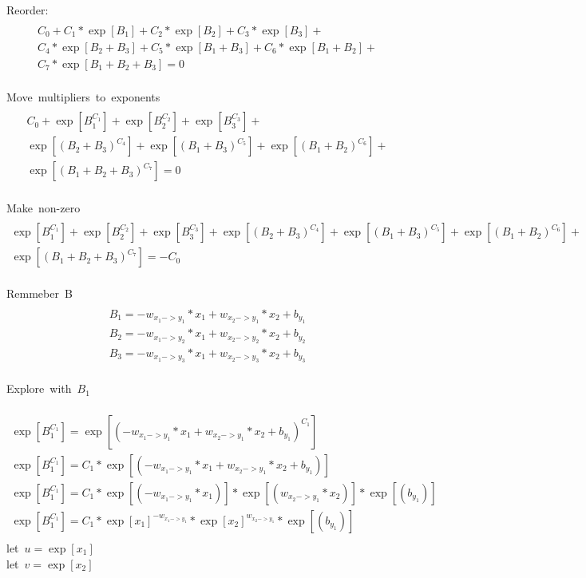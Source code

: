 \documentclass{article}
\begin{document}
\hbox{Reorder:}
\begin{multline}\\
    C_0 + C_1*\exp[B_1] + C_2*\exp[B_2] + C_3*\exp[B_3] +\\
    C_4*\exp[B_2+B_3] + C_5*\exp[B_1+B_3] + C_6*\exp[B_1+B_2] +\\
    C_7*\exp[B_1+B_2+B_3] = 0\\
\end{multline}

\hbox{Move multipliers to exponents}
\begin{multline}\\
    C_0 + \exp[B_1^{C_1}] + \exp[B_2^{C_2}] + \exp[B_3^{C_3}] +\\
    \exp[(B_2+B_3)^{C_4}] + \exp[(B_1+B_3)^{C_5}] + \exp[(B_1+B_2)^{C_6}] +\\
    \exp[(B_1+B_2+B_3)^{C_7}] = 0\\
\end{multline}  

\hbox{Make non-zero}
\begin{multline}\\
    \exp[B_1^{C_1}] + \exp[B_2^{C_2}] + \exp[B_3^{C_3}] +
    \exp[(B_2+B_3)^{C_4}] + \exp[(B_1+B_3)^{C_5}] + \exp[(B_1+B_2)^{C_6}] +\\
    \exp[(B_1+B_2+B_3)^{C_7}] = -C_0\\
\end{multline}

\hbox{Remmeber B}
\begin{multline}\\
    B_1 = -w_{x_1->y_1} * x_1 + w_{x_2->y_1} * x_2 + b_{y_1}\\
    B_2 = -w_{x_1->y_2} * x_1 + w_{x_2->y_2} * x_2 + b_{y_2}\\
    B_3 = -w_{x_1->y_3} * x_1 + w_{x_2->y_3} * x_2 + b_{y_3}\\
\end{multline}

\hbox{Explore with $B_1$}

\begin{multline}\\
    \exp[B_1^{C_1}] = \exp[(-w_{x_1->y_1} * x_1 + w_{x_2->y_1} * x_2 + b_{y_1})^{C_1}]\\
    \exp[B_1^{C_1}] = {C_1}*\exp[(-w_{x_1->y_1} * x_1 + w_{x_2->y_1} * x_2 + b_{y_1})]\\
    \exp[B_1^{C_1}] = {C_1}*\exp[(-w_{x_1->y_1} * x_1)]*\exp[(w_{x_2->y_1} * x_2)]*\exp[(b_{y_1})]\\
    \exp[B_1^{C_1}] = {C_1}*\exp[x_1]^{-w_{x_1->y_1}}*
                            \exp[x_2]^{w_{x_2->y_1} }*
                            \exp[(b_{y_1})]\\ 
\end{multline}
\hbox{let $u = \exp[x_1]$}\\
\hbox{let $v = \exp[x_2]$}
\end{document}
